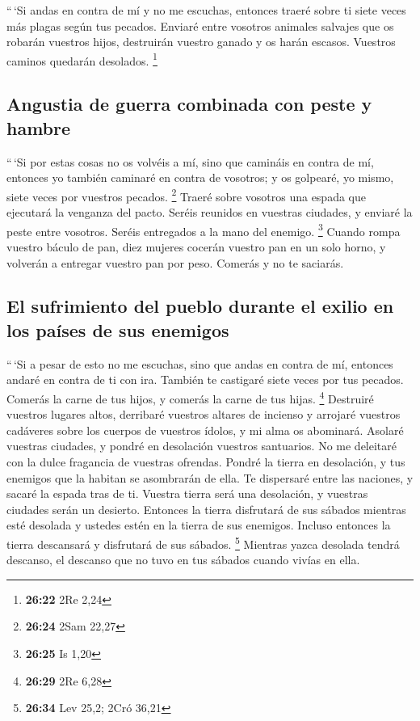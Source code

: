 \begin{paracol}{2}
 ``\,`Si andas en contra de mí y no me escuchas, entonces
traeré sobre ti siete veces más plagas según tus pecados.
 Enviaré entre vosotros animales salvajes que os robarán
vuestros hijos, destruirán vuestro ganado y os harán escasos. Vuestros
caminos quedarán desolados. \footnote{\textbf{26:22} 2Re 2,24}

\hypertarget{angustia-de-guerra-combinada-con-peste-y-hambre}{%
\subsection{Angustia de guerra combinada con peste y
hambre}\label{angustia-de-guerra-combinada-con-peste-y-hambre}}

 ``\,`Si por estas cosas no os volvéis a mí, sino que
camináis en contra de mí,  entonces yo también caminaré
en contra de vosotros; y os golpearé, yo mismo, siete veces por vuestros
pecados. \footnote{\textbf{26:24} 2Sam 22,27}  Traeré
sobre vosotros una espada que ejecutará la venganza del pacto. Seréis
reunidos en vuestras ciudades, y enviaré la peste entre vosotros. Seréis
entregados a la mano del enemigo. \footnote{\textbf{26:25} Is 1,20}
 Cuando rompa vuestro báculo de pan, diez mujeres cocerán
vuestro pan en un solo horno, y volverán a entregar vuestro pan por
peso. Comerás y no te saciarás.

\hypertarget{el-sufrimiento-del-pueblo-durante-el-exilio-en-los-pauxedses-de-sus-enemigos}{%
\subsection{El sufrimiento del pueblo durante el exilio en los países de
sus
enemigos}\label{el-sufrimiento-del-pueblo-durante-el-exilio-en-los-pauxedses-de-sus-enemigos}}

 ``\,`Si a pesar de esto no me escuchas, sino que andas
en contra de mí,  entonces andaré en contra de ti con
ira. También te castigaré siete veces por tus pecados. 
Comerás la carne de tus hijos, y comerás la carne de tus hijas.
\footnote{\textbf{26:29} 2Re 6,28}  Destruiré vuestros
lugares altos, derribaré vuestros altares de incienso y arrojaré
vuestros cadáveres sobre los cuerpos de vuestros ídolos, y mi alma os
abominará.  Asolaré vuestras ciudades, y pondré en
desolación vuestros santuarios. No me deleitaré con la dulce fragancia
de vuestras ofrendas.  Pondré la tierra en desolación, y
tus enemigos que la habitan se asombrarán de ella.  Te
dispersaré entre las naciones, y sacaré la espada tras de ti. Vuestra
tierra será una desolación, y vuestras ciudades serán un desierto.
 Entonces la tierra disfrutará de sus sábados mientras
esté desolada y ustedes estén en la tierra de sus enemigos. Incluso
entonces la tierra descansará y disfrutará de sus sábados. \footnote{\textbf{26:34}
  Lev 25,2; 2Cró 36,21}  Mientras yazca desolada tendrá
descanso, el descanso que no tuvo en tus sábados cuando vivías en ella.


\end{paracol}
